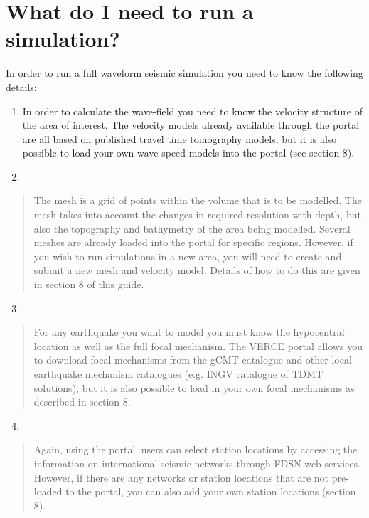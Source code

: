 \documentclass[english]{book}
\begin{document}
\section{What do I need to run a simulation?}
\label{\detokenize{Section2:what-do-i-need-to-run-a-simulation}}
In order to run a full waveform seismic simulation you need to know the
following details:
\begin{enumerate}
\item {} 

In order to calculate the wave-field you need to know the velocity
structure of the area of interest. The velocity models already available
through the portal are all based on published travel time tomography
models, but it is also possible to load your own wave speed models into
the portal (see section 8).

\item {} 

\end{enumerate}
\begin{quote}

The mesh is a grid of points within the volume that is to be modelled.
The mesh takes into account the changes in required resolution with
depth, but also the topography and bathymetry of the area being
modelled. Several meshes are already loaded into the portal for specific
regions. However, if you wish to run simulations in a new area, you will
need to create and submit a new mesh and velocity model. Details of how
to do this are given in section 8 of this guide.
\end{quote}
\begin{enumerate}
\setcounter{enumi}{2}
\item {} 

\end{enumerate}
\begin{quote}

For any earthquake you want to model you must know the hypocentral
location as well as the full focal mechanism. The VERCE portal allows
you to download focal mechanisms from the gCMT catalogue and other local
earthquake mechanism catalogues (e.g. INGV catalogue of TDMT solutions),
but it is also possible to load in your own focal mechanisms as
described in section 8.
\end{quote}
\begin{enumerate}
\setcounter{enumi}{3}
\item {} 

\end{enumerate}
\begin{quote}

Again, using the portal, users can select station locations by accessing
the information on international seismic networks through FDSN web
services. However, if there are any networks or station locations that
are not pre-loaded to the portal, you can also add your own station
locations (section 8).
\end{quote}
\end{document}
